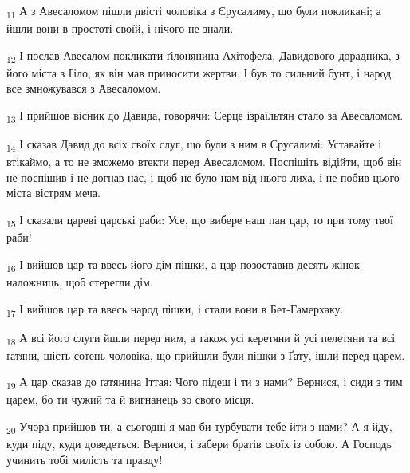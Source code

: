 \begin{tcolorbox}
\textsubscript{11} А з Авесаломом пішли двісті чоловіка з Єрусалиму, що були покликані; а йшли вони в простоті своїй, і нічого не знали.
\end{tcolorbox}
\begin{tcolorbox}
\textsubscript{12} І послав Авесалом покликати ґілонянина Ахітофела, Давидового дорадника, з його міста з Ґіло, як він мав приносити жертви. І був то сильний бунт, і народ все змножувався з Авесаломом.
\end{tcolorbox}
\begin{tcolorbox}
\textsubscript{13} І прийшов вісник до Давида, говорячи: Серце ізраїльтян стало за Авесаломом.
\end{tcolorbox}
\begin{tcolorbox}
\textsubscript{14} І сказав Давид до всіх своїх слуг, що були з ним в Єрусалимі: Уставайте і втікаймо, а то не зможемо втекти перед Авесаломом. Поспішіть відійти, щоб він не поспішив і не догнав нас, і щоб не було нам від нього лиха, і не побив цього міста вістрям меча.
\end{tcolorbox}
\begin{tcolorbox}
\textsubscript{15} І сказали цареві царські раби: Усе, що вибере наш пан цар, то при тому твої раби!
\end{tcolorbox}
\begin{tcolorbox}
\textsubscript{16} І вийшов цар та ввесь його дім пішки, а цар позоставив десять жінок наложниць, щоб стерегли дім.
\end{tcolorbox}
\begin{tcolorbox}
\textsubscript{17} І вийшов цар та ввесь народ пішки, і стали вони в Бет-Гамерхаку.
\end{tcolorbox}
\begin{tcolorbox}
\textsubscript{18} А всі його слуги йшли перед ним, а також усі керетяни й усі пелетяни та всі ґатяни, шість сотень чоловіка, що прийшли були пішки з Ґату, ішли перед царем.
\end{tcolorbox}
\begin{tcolorbox}
\textsubscript{19} А цар сказав до ґатянина Іттая: Чого підеш і ти з нами? Вернися, і сиди з тим царем, бо ти чужий та й вигнанець зо свого місця.
\end{tcolorbox}
\begin{tcolorbox}
\textsubscript{20} Учора прийшов ти, а сьогодні я мав би турбувати тебе йти з нами? А я йду, куди піду, куди доведеться. Вернися, і забери братів своїх із собою. А Господь учинить тобі милість та правду!
\end{tcolorbox}
